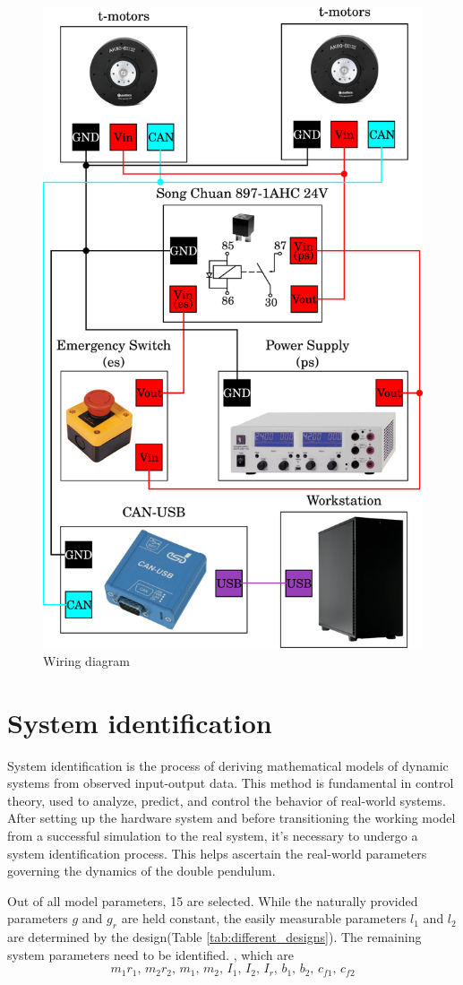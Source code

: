 \begin{figure}[H]
    \centering
    \includegraphics[width=0.7\linewidth]{figures/hardware_setup/wiring-diagram.png}
    \caption{Wiring diagram\cite{2023_ram_wiebe_double_pendulum}}
    \label{fig:wiring diagram}
\end{figure}

\section{System identification}
System identification is the process of deriving mathematical models of dynamic systems from observed input-output data. This method is fundamental in control theory, used to analyze, predict, and control the behavior of real-world systems. After setting up the hardware system and before transitioning the working model from a successful simulation to the real system, it's necessary to undergo a system identification process. This helps ascertain the real-world parameters governing the dynamics of the double pendulum.

Out of all model parameters, 15 are selected. While the naturally provided parameters \(g\) and \(g_r\) are held constant, the easily measurable parameters \(l_1\) and \(l_2\) are determined by the design(Table \ref{tab:different_designs}). The remaining system parameters need to be identified. , which are 
\[
m_1 r_1,\, m_2 r_2,\, m_1,\, m_2,\, I_1,\, I_2,\, I_r,\, b_1,\, b_2,\, c_{f1},\,c_{f2}
\]

